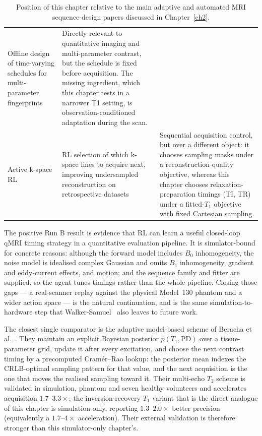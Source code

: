 \begin{table}[!htbp]
\begin{tabularx}{\linewidth}{>{\raggedright\arraybackslash}p{2.7cm}
>{\raggedright\arraybackslash}p{4.2cm}
>{\raggedright\arraybackslash}X}
Offline design of time-varying schedules for multi-parameter fingerprints &
Directly relevant to quantitative imaging and multi-parameter contrast, but the
schedule is fixed before acquisition. The missing ingredient, which this chapter
tests in a narrower T1 setting, is observation-conditioned adaptation during the
scan. \\
\addlinespace
Active k-space RL~\cite{pineda_active_mri_rl_2020} &
RL selection of which k-space lines to acquire next, improving undersampled
reconstruction on retrospective datasets &
Sequential acquisition control, but over a different object: it chooses
sampling masks under a reconstruction-quality objective, whereas this chapter
chooses relaxation-preparation timings (TI, TR) under a fitted-$T_1$
objective with fixed Cartesian sampling. \\
\bottomrule
\end{tabularx}
\caption{Position of this chapter relative to the main adaptive and automated
MRI sequence-design papers discussed in Chapter~\ref{ch2}.}
\label{tab:e2-related-position}
\end{table}

The positive Run B result is evidence that RL can learn a useful closed-loop
qMRI timing strategy in a quantitative evaluation pipeline. It is
simulator-bound for concrete reasons: although the forward model includes
$B_0$ inhomogeneity, the noise model is idealised complex Gaussian and omits
$B_1$ inhomogeneity, gradient and eddy-current effects, and motion; and the
sequence family and fitter are supplied, so the agent tunes timings rather than
the whole pipeline. Closing those gaps --- a real-scanner replay against the
physical Model~130 phantom and a wider action space --- is the natural
continuation, and is the same simulation-to-hardware step that
Walker-Samuel~\cite{Walk_RL_CONTROL_MRI:19} also leaves to future work.

The closest single comparator is the adaptive model-based scheme of Beracha
et al.~\cite{adaptive_mri:23}. They maintain an explicit Bayesian posterior
$p(T_1,\mathrm{PD})$ over a tissue-parameter grid, update it after every
excitation, and choose the next contrast timing by a precomputed Cram\'er--Rao
lookup: the posterior mean indexes the CRLB-optimal sampling pattern for that
value, and the next acquisition is the one that moves the realised sampling
toward it. Their multi-echo $T_2$ scheme is validated in simulation, phantom
and seven healthy volunteers and accelerates acquisition $1.7$--$3.3\times$;
the inversion-recovery $T_1$ variant that is the direct analogue of this chapter
is simulation-only, reporting $1.3$--$2.0\times$ better precision (equivalently a
$1.7$--$4\times$ acceleration). Their external validation is therefore stronger
than this simulator-only chapter's.


